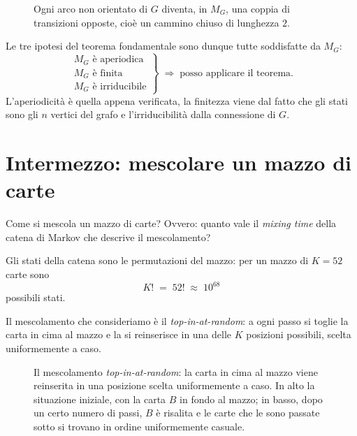 \begin{figure}[H]
  \centering
  
  \caption{Ogni arco non orientato di $G$ diventa, in $M_G$, una coppia di transizioni
  opposte, cioè un cammino chiuso di lunghezza $2$.}
  \label{fig:arco-ciclo2}
\end{figure}


Le tre ipotesi del teorema fondamentale sono dunque tutte soddisfatte da $M_G$:
\[
  \left.
  \begin{array}{l}
    M_G \text{ è aperiodica} \\[2pt]
    M_G \text{ è finita} \\[2pt]
    M_G \text{ è irriducibile}
  \end{array}
  \right\}
  \;\Longrightarrow\;
  \text{posso applicare il teorema.}
\]
L'aperiodicità è quella appena verificata, la finitezza viene dal fatto che gli stati sono
gli $n$ vertici del grafo e l'irriducibilità dalla connessione di $G$.

\section{Intermezzo: mescolare un mazzo di carte}

\begin{esercizio}\label{ex:mazzo-carte}
  Come si mescola un mazzo di carte? Ovvero: quanto vale il \emph{mixing time} della catena
  di Markov che descrive il mescolamento?
\end{esercizio}

Gli stati della catena sono le permutazioni del mazzo: per un mazzo di $K = 52$ carte sono
\[
  K! \;=\; 52! \;\approx\; 10^{68}
\]
possibili stati.

Il mescolamento che consideriamo è il \emph{top-in-at-random}: a ogni passo si toglie la
carta in cima al mazzo e la si reinserisce in una delle $K$ posizioni possibili, scelta
uniformemente a caso.

\begin{figure}[H]
  \centering
  
  \caption{Il mescolamento \emph{top-in-at-random}: la carta in cima al mazzo viene
  reinserita in una posizione scelta uniformemente a caso. In alto la situazione iniziale,
  con la carta $B$ in fondo al mazzo; in basso, dopo un certo numero di passi, $B$ è
  risalita e le carte che le sono passate sotto si trovano in ordine uniformemente
  casuale.}
  \label{fig:top-in-at-random}
\end{figure}


